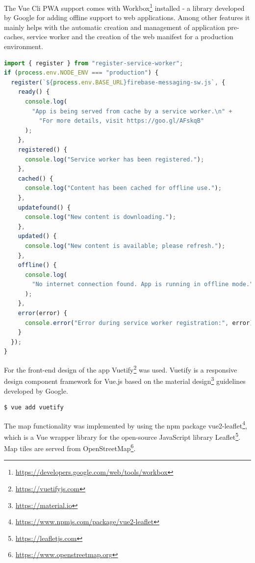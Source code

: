 
The Vue Cli PWA support comes with Workbox\footnote{\url{https://developers.google.com/web/tools/workbox}} installed - a library developed by Google for adding offline support to web applications. Among other features it mainly helps with the automatic creation and management of application pre-caches, service worker and the creation of the web manifest for a production environment.

\begin{lstlisting}[language=JavaScript, caption=registerServiceWorker.js: Workbox registering the service worker for production, label=lst:workbox]
import { register } from "register-service-worker";
if (process.env.NODE_ENV === "production") {
  register(`${process.env.BASE_URL}firebase-messaging-sw.js`, {
    ready() {
      console.log(
        "App is being served from cache by a service worker.\n" +
          "For more details, visit https://goo.gl/AFskqB"
      );
    },
    registered() {
      console.log("Service worker has been registered.");
    },
    cached() {
      console.log("Content has been cached for offline use.");
    },
    updatefound() {
      console.log("New content is downloading.");
    },
    updated() {
      console.log("New content is available; please refresh.");
    },
    offline() {
      console.log(
        "No internet connection found. App is running in offline mode."
      );
    },
    error(error) {
      console.error("Error during service worker registration:", error);
    }
  });
}
\end{lstlisting}

For the front-end design of the app Vuetify\footnote{\url{https://vuetifyjs.com}} was used. Vuetify is a responsive design component framework for Vue.js based on the material design\footnote{\url{https://material.io}} guidelines developed by Google.

\begin{lstlisting}[language=bash, caption=Command to add Vuetify to the Vue.js project, label=lst:vuetify]
  $ vue add vuetify
\end{lstlisting}

The map functionality was implemented by using the npm package vue2-leaflet\footnote{\url{https://www.npmjs.com/package/vue2-leaflet}}, which is a Vue wrapper library for the open-source JavaScript library Leaflet\footnote{\url{https://leafletjs.com}}. Map tiles are served from OpenStreetMap\footnote{\url{https://www.openstreetmap.org}}.

